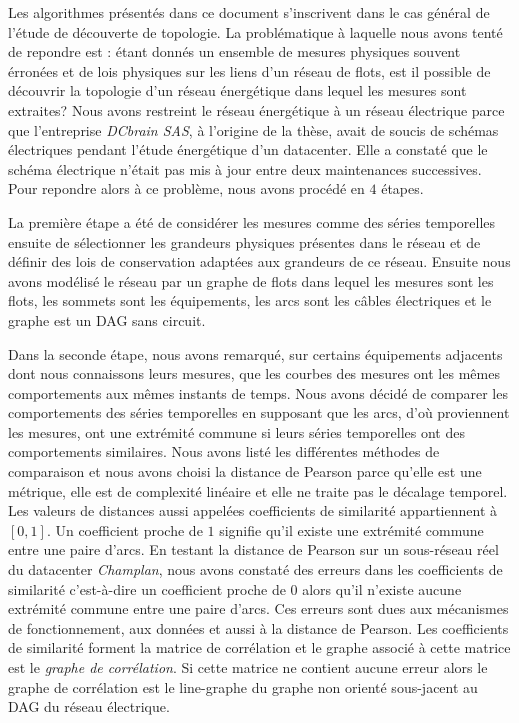 Les algorithmes pr\'esent\'es dans ce document s'inscrivent dans le cas g\'en\'eral de l'\'etude de d\'ecouverte de topologie. La probl\'ematique \`a laquelle nous avons tent\'e de repondre est :
\'etant donn\'es un ensemble de mesures physiques souvent \'erron\'ees et de lois physiques sur les liens d'un r\'eseau de flots, est il possible de d\'ecouvrir la topologie d'un r\'eseau \'energ\'etique dans lequel les mesures sont extraites?
Nous avons restreint le r\'eseau \'energ\'etique \`a un r\'eseau \'electrique parce que l'entreprise {\em DCbrain SAS}, \`a l'origine de la th\`ese, avait de soucis de sch\'emas \'electriques pendant l'\'etude \'energ\'etique d'un datacenter. Elle a constat\'e que le sch\'ema \'electrique n'\'etait pas mis \`a jour  entre deux maintenances successives.
Pour repondre alors \`a ce probl\`eme, nous avons proc\'ed\'e en $4$ \'etapes.
\newline

La premi\`ere \'etape a \'et\'e de consid\'erer les mesures comme des s\'eries temporelles ensuite de s\'electionner les grandeurs physiques pr\'esentes dans le r\'eseau et de d\'efinir des lois de conservation adapt\'ees aux grandeurs de ce r\'eseau. Ensuite nous avons mod\'elis\'e le r\'eseau par un graphe de flots dans lequel les mesures sont les flots, les sommets sont les \'equipements, les arcs sont les c\^ables \'electriques et le graphe est un DAG sans circuit.
\newline

Dans la seconde \'etape, nous avons remarqu\'e, sur certains \'equipements adjacents dont nous connaissons leurs mesures, que les courbes des mesures ont les m\^emes comportements aux m\^emes instants de temps. Nous avons d\'ecid\'e de comparer  les comportements des s\'eries temporelles en supposant que les arcs, d'o\`u proviennent les mesures, ont une extr\'emit\'e commune si leurs s\'eries temporelles ont des comportements similaires. Nous avons list\'e les diff\'erentes m\'ethodes de comparaison et nous avons choisi la distance de Pearson parce qu'elle est une m\'etrique, 
elle est de complexit\'e lin\'eaire et 
elle ne traite pas le d\'ecalage temporel. 
Les valeurs de distances aussi appel\'ees coefficients de similarit\'e appartiennent \`a $[0,1]$. Un coefficient proche de $1$ signifie qu'il existe une extr\'emit\'e commune entre une paire d'arcs. En testant la distance de Pearson sur un sous-r\'eseau r\'eel du datacenter {\em Champlan}, nous avons constat\'e des erreurs dans les coefficients de similarit\'e c'est-\`a-dire un coefficient proche de $0$ alors qu'il n'existe aucune extr\'emit\'e commune entre une paire d'arcs. Ces erreurs  sont dues aux m\'ecanismes de fonctionnement, aux donn\'ees et aussi \`a la distance de Pearson. 
Les coefficients de similarit\'e forment la matrice de corr\'elation et le graphe associ\'e \`a cette matrice est le {\em graphe de corr\'elation}. Si cette matrice ne contient aucune erreur alors le graphe de corr\'elation est le line-graphe du graphe non orient\'e sous-jacent au DAG du r\'eseau \'electrique. 
\newline

